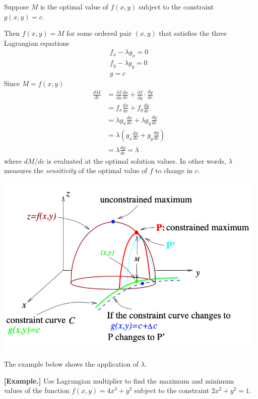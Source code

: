 \documentclass[11pt, a4paper]{MATH2023}
\newcommand{\eg}{\textbf{[Example.] }}
\begin{document}
\begin{spacing}{1.3}
    Suppose $M$ is the optimal value of $f(x, y)$ subject to the constraint $g(x, y)=c.$

    Then $f(x, y)=M$ for some ordered pair $(x, y)$ that satisfies the three Lagrangian equations
    $$\begin{array}{r}
        f_{x}-\lambda g_{x}=0 \\
        f_{y}-\lambda g_{y}=0 \\
        g=c
    \end{array}$$
    Since $M=f(x, y)$
    $$\begin{aligned}
    \frac{d M}{d c} &=\frac{\partial f}{\partial x} \frac{d x}{d c}+\frac{\partial f}{\partial y} \cdot \frac{d y}{d c} \\
    &=f_{x} \frac{d x}{d c}+f_{y} \frac{d y}{d c} \\
    &=\lambda g_{x} \frac{d x}{d c}+\lambda g_{y} \frac{d y}{d c} \\
    &=\lambda\left(g_{x} \frac{d x}{d c}+g_{y} \frac{d y}{d c}\right) \\
    &=\lambda \frac{d g}{d c}=\lambda
    \end{aligned}$$
    where $d M / d c$ is evaluated at the optimal solution values. In other words, $\lambda$ measures 
    the {\it sensitivity} of the optimal value of $f$ to change in $c$.
    \begin{center}
        \includegraphics[scale=0.53]{images/Ch13-intepret-lambda.png}
    \end{center}

    \newpage
    {\blue The example below shows the application of $\lambda$.}
    
    \eg Use Lagrangian multiplier to find the maximum and minimum values of the function
    $f(x, y)=4 x^{3}+y^{2}$
    subject to the constraint $2x^{2}+y^{2}=1$.


\end{spacing}
\end{document}
